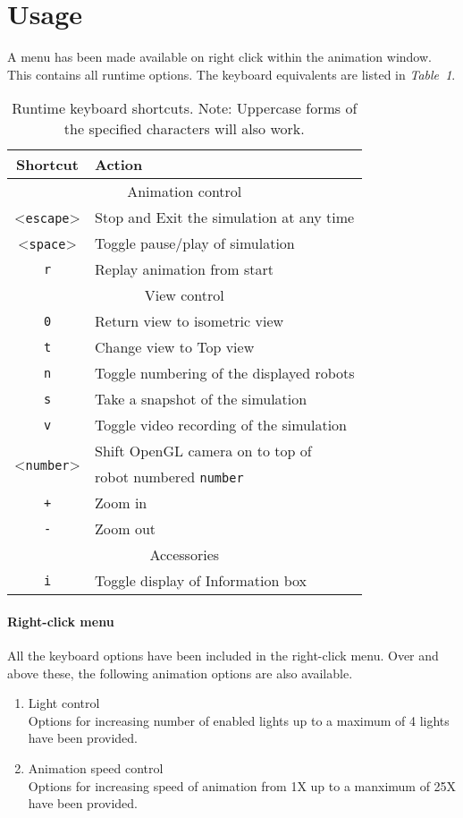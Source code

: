 \documentclass[10pt,a4paper]{article}
\begin{document}
\section{Usage}
A menu has been made available on right click within the animation window. This contains all runtime options. The keyboard equivalents are listed in \mbox{\emph{Table 1}}.
\begin{table}[ht]
\centering
\begin{tabular}{| c | l |}
\hline
Shortcut & Action \\
\hline
\multicolumn{2}{|c|}{Animation control} \\
\hline
\textless\texttt{escape}\textgreater & Stop and Exit the simulation at any time \\
\hline
\textless\texttt{space}\textgreater & Toggle pause/play of simulation \\
\hline
\texttt{r} & Replay animation from start \\
\hline
\multicolumn{2}{|c|}{View control} \\
\hline
\texttt{0} & Return view to isometric view \\
\hline
\texttt{t} & Change view to Top view \\
\hline
\texttt{n} & Toggle numbering of the displayed robots \\
\hline
\texttt{s} & Take a snapshot of the simulation \\
\hline
\texttt{v} & Toggle video recording of the simulation \\
\hline
\multirow{2}{*}{\textless\texttt{number}\textgreater} & Shift OpenGL camera on to top of \\
	& robot numbered \texttt{number} \\
\hline
\texttt{+} & Zoom in \\
\hline
\texttt{-} & Zoom out \\
\hline
\multicolumn{2}{|c|}{Accessories} \\
\hline
\texttt{i} & Toggle display of Information box \\
\hline
\end{tabular}
\caption{Runtime keyboard shortcuts. Note: Uppercase forms of the specified characters will also work.}
\end{table}
\paragraph{Right-click menu}
All the keyboard options have been included in the right-click menu. Over and above these, the following animation options are also available.
\begin{enumerate}
\item Light control \\
Options for increasing number of enabled lights up to a maximum of 4 lights have been provided.
\item Animation speed control \\
Options for increasing speed of animation from 1X up to a manximum of 25X have been provided.
\end{enumerate}
\end{document}

